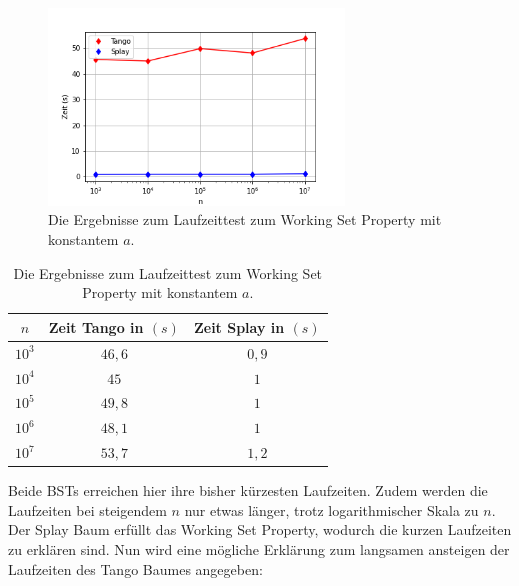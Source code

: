 \documentclass[a4paper,12pt]{article}
\begin{document}
\begin{figure}[H]
	\centering
	\includegraphics[width=0.7\textwidth]{Medien/laufzeittest/diagramm/workingset}
	\caption{Die Ergebnisse zum Laufzeittest zum Working Set Property mit konstantem $a$.}
\end{figure}
\begin{table}[H]
	\begin{center}
		\begin{tabular}[c]{|c|c|c|}
			\hline
			$n$ & Zeit Tango in $\left(s\right)$ &Zeit Splay in $\left(s\right)$ \\
			\hline
			$10^3$ & $46,6$ &$0,9$ \\
			\hline
			$10^4$  & $45$ &$1$  \\
			\hline
			$10^5$  & $49,8$ &$1$  \\
			\hline
			$10^6$  & $48,1$ &$1$  \\
			\hline
			$10^7$  & $53,7$ &$1,2$  \\
			\hline
		\end{tabular}
		\caption{Die Ergebnisse zum Laufzeittest zum Working Set Property mit konstantem $a$.} 
	\end{center}
\end{table}
\noindent Beide BSTs erreichen hier ihre bisher kürzesten Laufzeiten. Zudem werden die Laufzeiten  bei steigendem $n$ nur etwas länger, trotz logarithmischer Skala zu $n$. Der Splay Baum erfüllt das Working Set Property, wodurch die kurzen Laufzeiten zu erklären sind. Nun wird eine mögliche Erklärung zum langsamen ansteigen der Laufzeiten des Tango Baumes angegeben: \\
\end{document}
